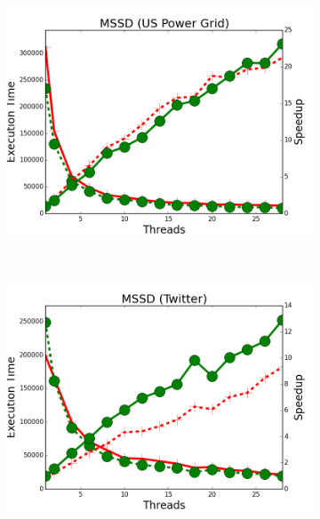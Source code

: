 \begin{figure}[h]
\begin{subfigure}[b]{\smallplotsize\textwidth}
                \includegraphics[width=\textwidth]{experiments/scalability/no-refs-allocator-shortest-uspowergrid.png}
                \label{fig:implementation:no_refs_sssp}
        \end{subfigure}
        ~
        \begin{subfigure}[b]{\smallplotsize\textwidth}
                \includegraphics[width=\textwidth]{experiments/scalability/no-refs-allocator-shortest-twitter.png}
                \label{fig:implementation:no_refs_sssp}
        \end{subfigure}\\
        \begin{subfigure}[b]{\smallplotsize\textwidth}

\end{subfigure}
\end{figure}
